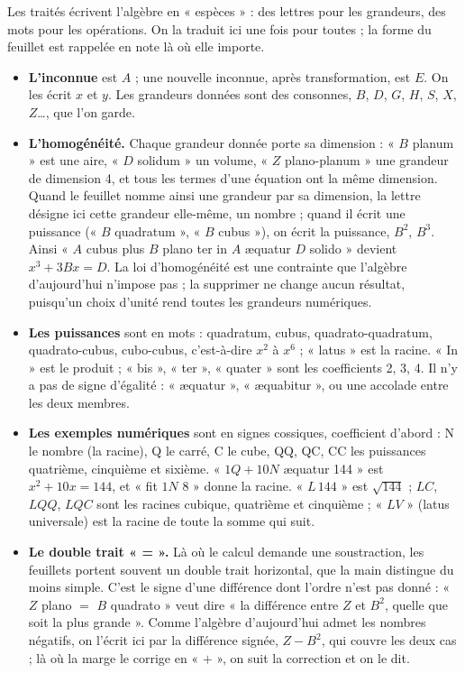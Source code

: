\documentclass[11pt,a4paper]{article}
\begin{document}
Les traités écrivent l'algèbre en « espèces » : des lettres pour les grandeurs,
des mots pour les opérations. On la traduit ici une fois pour toutes ; la
forme du feuillet est rappelée en note là où elle importe.

\begin{itemize}
  \item \textbf{L'inconnue} est $A$ ; une nouvelle inconnue, après
    transformation, est $E$. On les écrit $x$ et $y$. Les grandeurs données sont
    des consonnes, $B$, $D$, $G$, $H$, $S$, $X$, $Z$\ldots, que l'on garde.
  \item \textbf{L'homogénéité.} Chaque grandeur donnée porte sa dimension :
    « $B$ planum » est une aire, « $D$ solidum » un volume, « $Z$ plano-planum »
    une grandeur de dimension 4, et tous les termes d'une équation ont la même
    dimension. Quand le feuillet nomme ainsi une grandeur par sa dimension, la
    lettre désigne ici cette grandeur elle-même, un nombre ; quand il écrit une
    puissance (« $B$ quadratum », « $B$ cubus »), on écrit la puissance, $B^2$,
    $B^3$. Ainsi « $A$ cubus plus $B$ plano ter in $A$ æquatur $D$ solido »
    devient $x^3 + 3Bx = D$. La loi d'homogénéité est une contrainte que
    l'algèbre d'aujourd'hui n'impose pas ; la supprimer ne change aucun
    résultat, puisqu'un choix d'unité rend toutes les grandeurs numériques.
  \item \textbf{Les puissances} sont en mots : quadratum, cubus,
    quadrato-quadratum, quadrato-cubus, cubo-cubus, c'est-à-dire $x^2$ à $x^6$ ;
    « latus » est la racine. « In » est le produit ; « bis », « ter »,
    « quater » sont les coefficients 2, 3, 4. Il n'y a pas de signe d'égalité :
    « æquatur », « æquabitur », ou une accolade entre les deux membres.
  \item \textbf{Les exemples numériques} sont en signes cossiques, coefficient
    d'abord : N le nombre (la racine), Q le carré, C le cube, QQ, QC, CC les
    puissances quatrième, cinquième et sixième. « $1Q + 10N$ æquatur 144 » est
    $x^2 + 10x = 144$, et « fit $1N$ 8 » donne la racine. « $L\,144$ » est
    $\sqrt{144}$ ; $LC$, $LQQ$, $LQC$ sont les racines cubique, quatrième et
    cinquième ; « $LV$ » (latus universale) est la racine de toute la somme qui
    suit.
  \item \textbf{Le double trait « = ».} Là où le calcul demande une
    soustraction, les feuillets portent souvent un double trait horizontal, que
    la main distingue du moins simple. C'est le signe d'une différence dont
    l'ordre n'est pas donné : « $Z$ plano $=$ $B$ quadrato » veut dire « la
    différence entre $Z$ et $B^2$, quelle que soit la plus grande ». Comme
    l'algèbre d'aujourd'hui admet les nombres négatifs, on l'écrit ici par la
    différence signée, $Z - B^2$, qui couvre les deux cas ; là où la marge le
    corrige en « $+$ », on suit la correction et on le dit.
\end{itemize}
\end{document}
